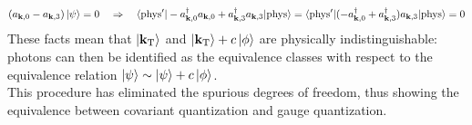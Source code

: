 \begin{equation*}
  (a_{\mathbf{k},0} - a_{\mathbf{k},3}) \ket{\psi} = 0
  \quad \Rightarrow \quad
  \braket{\text{phys}' | -a_{\mathbf{k},0}^\dagger a_{\mathbf{k},0} + a_{\mathbf{k},3}^\dagger a_{\mathbf{k},3} | \text{phys}} = \braket{\text{phys}' | (-a_{\mathbf{k},0}^\dagger + a_{\mathbf{k},3}^\dagger) a_{\mathbf{k},3} | \text{phys}} = 0
\end{equation*}
These facts mean that $ \ket{\mathbf{k}_\text{T}} $ and $ \ket{\mathbf{k}_\text{T}} + c \ket{\phi} $ are physically indistinguishable: photons can then be identified as the equivalence classes with respect to the equivalence relation $ \ket{\psi} \sim \ket{\psi} + c \ket{\phi} $. \\
This procedure has eliminated the spurious degrees of freedom, thus showing the equivalence between covariant quantization and gauge quantization.











